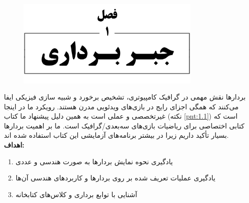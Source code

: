 \chapter{}
\textbf{\vspace{-140pt}}
\begin{figure}[H]
    \centering
    \setlength{\belowcaptionskip}{-10pt}
    \includegraphics[width=0.8\textwidth]{Images/4/1/4.Session.1.1.0}
    \label{fig:4.Session.1.1.0}
\end{figure}
\textbf{\vspace{20pt}}
{
    \Large
    \begin{spacing}{1.5}
        بردارها نقش مهمی در گرافیک کامپیوتری، تشخیص برخورد و شبیه سازی فیزیکی ایفا می‌کنند که همگی اجزای رایج در بازی‌های ویدئویی مدرن هستند.
        رویکرد ما در اینجا غیر‌تخصصی و عملی است به همین دلیل پیشنهاد ما کتاب  (نکته \ref{pnt:1.1}) است که کتابی اختصاصی برای ریاضیات بازی‌های سه‌بعدی/گرافیک است.
        ما بر اهمیت بردارها بسیار تأکید داریم زیرا در بیشتر برنامه‌های آزمایشی این کتاب استفاده شده اند.
        \\

        \textbf{\LARGE \hspace{-40pt}اهداف:}
        \begin{enumerate}[label=\textbf{\arabic*}.]
            \item {یادگیری نحوه نمایش بردارها به صورت هندسی و عددی}
            \item {یادگیری عملیات تعریف شده بر روی بردارها و کاربردهای هندسی آن‌ها}
            \item {آشنایی با توابع برداری و کلاس‌های کتابخانه }
        \end{enumerate}
    \end{spacing}
}
\newpage

\setcounter{figure}{0}
\renewcommand{\thefigure}{\arabic{figure}.\arabic{chapter}}


